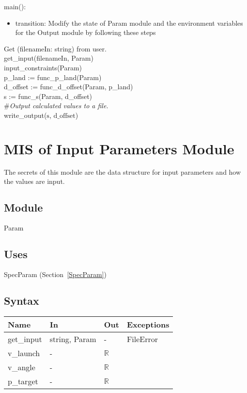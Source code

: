 \documentclass[12pt, titlepage]{article}
\begin{document}
\noindent main():
\begin{itemize}
\item transition: Modify the state of Param module and the environment variables
  for the Output module by following these steps\\
\end{itemize}

\noindent Get (filenameIn: string) from user.\\
\noindent get\_input(filenameIn, Param)\\
\noindent input\_constraints(Param)\\
\noindent p\_land := func\_p\_land(Param)\\
\noindent d\_offset := func\_d\_offset(Param, p\_land)\\
\noindent s := func\_s(Param, d\_offset)\\
\noindent \#\textit{Output calculated values to a file.}\\
\noindent write\_output($\text{s}$, $\text{d\_offset}$)\\

\newpage

\section{MIS of Input Parameters Module} \label{Parameters}

The secrets of this module are the data structure for input parameters and how 
the values are input.

\subsection{Module}

Param

\subsection{Uses}

SpecParam (Section~\ref{SpecParam})

\subsection{Syntax}

\begin{tabular}{p{3cm} p{1cm} p{1cm} >{\raggedright\arraybackslash}p{9cm}}
\toprule
\textbf{Name} & \textbf{In} & \textbf{Out} & \textbf{Exceptions} \\
\midrule
get\_input & string, Param & - &  FileError \\
v\_launch & - & $\mathbb{R}$\\
v\_angle & - & $\mathbb{R}$\\
p\_target & - & $\mathbb{R}$\\
\bottomrule
\end{tabular}
\end{document}
